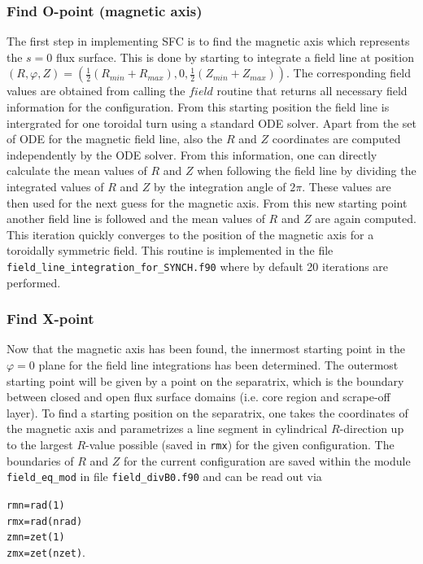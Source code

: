 \documentclass[./main.tex]{subfiles}
\begin{document}
\subsubsection{Find O-point (magnetic axis)}
The first step in implementing SFC is to find the magnetic axis which represents the $s=0$ flux surface. This is done by starting to integrate a field line  at position $(R,\varphi,Z) = (\frac{1}{2}(R_{min}+R_{max}),0,\frac{1}{2}(Z_{min}+Z_{max}))$. The corresponding field values are obtained from calling the $field$ routine that returns all necessary field information for the configuration. From this starting position the field line is intergrated for one toroidal turn using a standard ODE solver. Apart from the set of ODE for the magnetic field line, also the $R$ and $Z$ coordinates are computed independently by the ODE solver. From this information, one can directly calculate the mean values of $R$ and $Z$ when following the field line by dividing the integrated values of $R$ and $Z$ by the integration angle of $2\pi$. These values are then used for the next guess for the magnetic axis. From this new starting point another field line is followed and the mean values of $R$ and $Z$ are again computed. This iteration quickly converges to the position of the magnetic axis for a toroidally symmetric field. This routine is implemented in the file \texttt{field\_line\_integration\_for\_SYNCH.f90} where by default 20 iterations are performed.
\subsubsection{Find X-point}
Now that the magnetic axis has been found, the innermost starting point in the $\varphi = 0 $ plane for the field line integrations has been determined. The outermost starting point will be given by a point on the separatrix, which is the boundary between closed and open flux surface domains (i.e. core region and scrape-off layer). To find a starting position on the separatrix, one takes the coordinates of the magnetic axis and parametrizes a line segment in cylindrical $R$-direction up to the largest $R$-value possible (saved in \texttt{rmx}) for the given configuration. The boundaries of $R$ and $Z$ for the current configuration are saved within the module \texttt{field\_eq\_mod} in file \texttt{field\_divB0.f90} and can be read out via

\texttt{rmn=rad(1)\\
rmx=rad(nrad)\\
zmn=zet(1)\\
zmx=zet(nzet)}.
\end{document}
